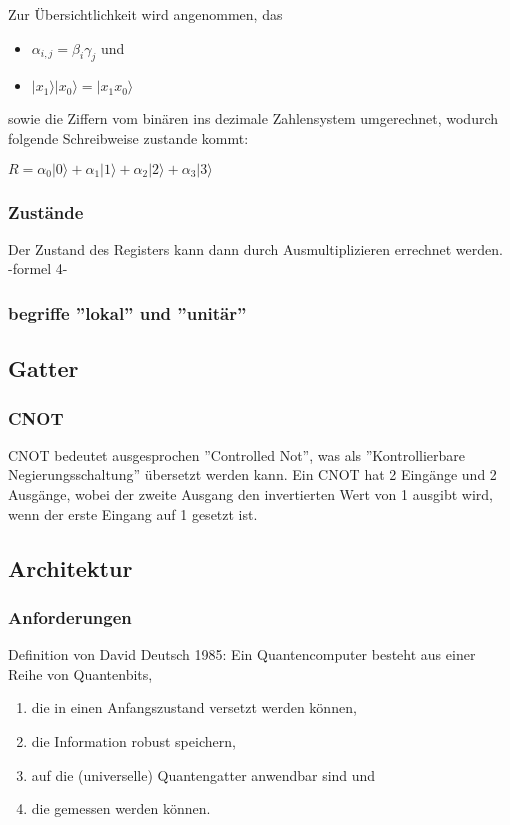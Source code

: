 Zur Übersichtlichkeit wird angenommen, das
\begin{itemize}
	\item $\alpha_{i,j} = \beta_i\gamma_j$ und
	\item $|x_1\rangle|x_0\rangle = |x_1 x_0\rangle$
\end{itemize}
sowie die Ziffern vom binären ins dezimale Zahlensystem umgerechnet, wodurch folgende Schreibweise zustande kommt:

$R = \alpha_0|0\rangle+\alpha_1|1\rangle+\alpha_2|2\rangle+\alpha_3|3\rangle$

\subsubsection{Zustände}

Der Zustand des Registers kann dann durch Ausmultiplizieren errechnet werden. -formel 4-

\subsubsection{begriffe ''lokal'' und ''unitär''}

\subsection{Gatter}
\label{sec:Gatter}

\subsubsection{CNOT}

CNOT bedeutet ausgesprochen ''Controlled Not'', was als ''Kontrollierbare Negierungsschaltung'' übersetzt werden kann.
Ein CNOT hat 2 Eingänge und 2 Ausgänge, wobei der zweite Ausgang den invertierten Wert von 1 ausgibt wird, wenn der erste Eingang auf 1 gesetzt ist.

\subsection{Architektur}
\label{sec:Architektur}

\subsubsection{Anforderungen}

Definition von David Deutsch 1985:
Ein Quantencomputer besteht aus einer Reihe von Quantenbits,
\begin{enumerate}
	\item die in einen Anfangszustand versetzt werden können,
	\item die Information robust speichern,
	\item auf die (universelle) Quantengatter anwendbar sind und
	\item die gemessen werden können.
\end{enumerate}


